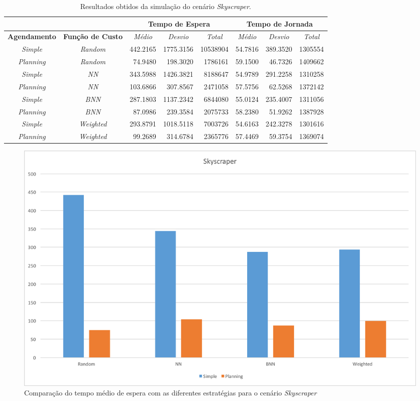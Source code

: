 \begin{table}[htb!]
\centering
\caption{Resultados obtidos da simulação do cenário \textit{Skyscraper}.}
\label{tab:results:skyscraper}
\begin{tabular}{|c|c|r|r|r|r|r|r|}
\hline
\multicolumn{2}{|c|}{\textbf{}}                 & \multicolumn{3}{c|}{\textbf{Tempo de Espera}}                                                                    & \multicolumn{3}{c|}{\textbf{Tempo de Jornada}}                                                                                                                       \\ \hline
\textbf{Agendamento} & \textbf{Função de Custo} & \multicolumn{1}{c|}{\textit{Médio}} & \multicolumn{1}{c|}{\textit{Desvio}} & \multicolumn{1}{c|}{\textit{Total}} & \multicolumn{1}{c|}{\textit{Médio}}                   & \multicolumn{1}{c|}{\textit{Desvio}}                  & \multicolumn{1}{c|}{\textit{Total}}                  \\ \hline
\textit{Simple}      & \textit{Random}          & 442.2165  & 1775.3156  & 10538904 & 54.7816 & 389.3520 & 1305554 \\ \hline
\textit{Planning}    & \textit{Random}          &  74.9480  &  198.3020  &  1786161 & 59.1500 &  46.7326 & 1409662 \\ \hline
\textit{Simple}      & \textit{NN}              & 343.5988  & 1426.3821  &  8188647 & 54.9789 & 291.2258 & 1310258 \\ \hline
\textit{Planning}    & \textit{NN}              & 103.6866  &  307.8567  &  2471058 & 57.5756 &  62.5268 & 1372142 \\ \hline
\textit{Simple}      & \textit{BNN}             & 287.1803  & 1137.2342  &  6844080 & 55.0124 & 235.4007 & 1311056 \\ \hline
\textit{Planning}    & \textit{BNN}             &  87.0986  &  239.3584  &  2075733 & 58.2380 &  51.9262 & 1387928 \\ \hline
\textit{Simple}      & \textit{Weighted}        & 293.8791  & 1018.5118  &  7003726 & 54.6163 & 242.3278 & 1301616 \\ \hline
\textit{Planning}    & \textit{Weighted}        &  99.2689  &  314.6784  &  2365776 & 57.4469 &  59.3754 & 1369074 \\ \hline
\end{tabular}
\end{table}

\begin{figure}[htb]
  \centering
  \includegraphics[scale=0.5]{img/chart-averages-skyscraper}
  \caption{Comparação do tempo médio de espera com as diferentes estratégias
    para o cenário \textit{Skyscraper}}
  \label{fig:result:average:skyscraper}
\end{figure}